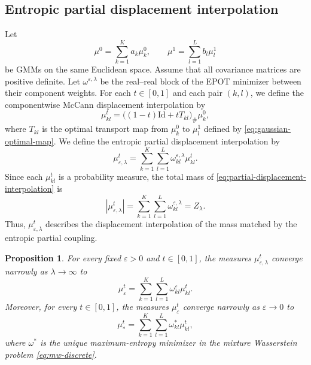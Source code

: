 \documentclass[a4paper,11pt]{article}
\numberwithin{equation}{section}
\newtheorem{prop}[thm]{Proposition}
\newcommand{\eps}{\varepsilon}
\newcommand{\Id}{\mathrm{Id}}
\begin{document}
\subsection{Entropic partial displacement interpolation}\label{subsec:epot-interpolation}
Let
\begin{equation*}
  \mu^0=\sum_{k=1}^{K}a_k\mu^0_k,\qquad \mu^1=\sum_{l=1}^{L}b_l\mu^1_l
\end{equation*}
be GMMs on the same Euclidean space. Assume that all covariance matrices are positive definite. Let $\omega^{\eps,\lambda}$ be the real--real block of the EPOT minimizer between their component weights. For each $t\in[0,1]$ and each pair $(k,l)$, we define the componentwise McCann displacement interpolation by
\begin{equation}\label{eq:component-interpolation}
  \mu^t_{kl}=\bigl((1-t)\Id+tT_{kl}\bigr)_\#\mu^0_k,
\end{equation}
where $T_{kl}$ is the optimal transport map from $\mu^0_k$ to $\mu^1_l$ defined by \eqref{eq:gaussian-optimal-map}. We define the entropic partial displacement interpolation by
\begin{equation}\label{eq:partial-displacement-interpolation}
  \mu^t_{\eps,\lambda}=\sum_{k=1}^{K}\sum_{l=1}^{L}\omega^{\eps,\lambda}_{kl}\mu^t_{kl}.
\end{equation}
Since each $\mu^t_{kl}$ is a probability measure, the total mass of \eqref{eq:partial-displacement-interpolation} is
\begin{equation*}
|\mu^t_{\eps,\lambda}|=\sum_{k=1}^{K}\sum_{l=1}^{L}\omega^{\eps,\lambda}_{kl}=Z_{\lambda}.
\end{equation*}
Thus, $\mu^t_{\eps,\lambda}$ describes the displacement interpolation of the mass matched by the entropic partial coupling.

\begin{prop}\label{prop:displacement-interpolation-convergence}
For every fixed $\eps>0$ and $t\in[0,1]$, the measures $\mu^t_{\eps,\lambda}$ converge narrowly as $\lambda\to\infty$ to
\begin{equation}\label{eq:balanced-displacement-interpolation}
\mu^t_{\eps}=\sum_{k=1}^{K}\sum_{l=1}^{L}\omega^\eps_{kl}\mu^t_{kl}.
\end{equation}
Moreover, for every $t\in[0,1]$, the measures $\mu^t_{\eps}$ converge narrowly as $\eps\to0$ to
\begin{equation}\label{eq:unregularized-displacement-interpolation}
  \mu^t_*=\sum_{k=1}^{K}\sum_{l=1}^{L}\omega^*_{kl}\mu^t_{kl},
\end{equation}
where $\omega^*$ is the unique maximum-entropy minimizer in the mixture Wasserstein problem \eqref{eq:mw-discrete}.
\end{prop}
\end{document}
